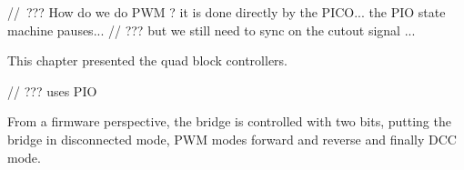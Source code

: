 \FloatBarrier


// ??? How do we do PWM ? it is done directly by the PICO... the PIO state machine pauses...
// ??? but we still need to sync on the cutout signal ...



This chapter presented the quad block controllers. 

// ??? uses PIO


From a firmware perspective, the bridge is controlled with two bits, putting the bridge in disconnected mode, PWM modes forward and reverse and finally DCC mode.

